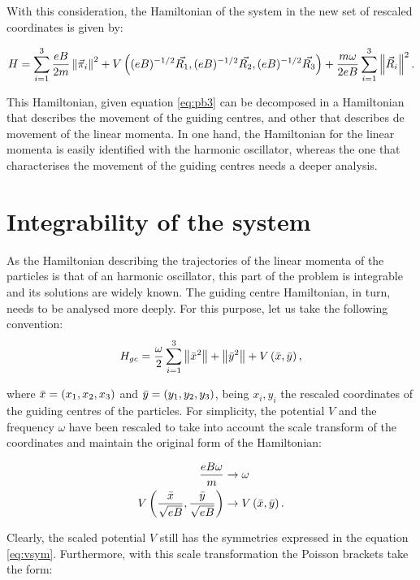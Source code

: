 With this consideration, the Hamiltonian of the system in the new set of rescaled coordinates is given by:

\begin{equation}
H = \sum_{i=1}^{3} \frac{eB}{2m} \left\lVert  \vec{\pi}_i \right\rVert^2
+ V\left(  (eB)^{-1/2}\vec{R_1},(eB)^{-1/2}\vec{R_2}, (eB)^{-1/2}\vec{R_3}  \right)
+\frac{m\omega}{2eB}\sum_{i=1}^{3} \left\lVert \vec{R}_i \right\rVert^2.
\label{eq:newham}
\end{equation}

This Hamiltonian, given equation \eqref{eq:pb3} can be decomposed in a Hamiltonian that describes the movement of the guiding centres, and other that describes de movement of the linear momenta. In one hand, the Hamiltonian for the linear momenta is easily identified with the harmonic oscillator, whereas the one that characterises the movement of the guiding centres needs a deeper analysis.

\section{Integrability of the system}
As the Hamiltonian describing the trajectories of the linear momenta of the particles is that of an harmonic oscillator, this part of the problem is integrable and its solutions are widely known. The guiding centre Hamiltonian, in turn, needs to be analysed more deeply. For this purpose, let us take the following convention:\\

\begin{equation}
H_{gc} = \frac{\omega}{2} \sum_{i=1}^{3} \left\lVert \bar{x}^2 \right\rVert + \left\lVert \bar{y}^2 \right\rVert
+ V\left( \bar{x},\bar{y} \right),
\label{eq:hamgc}
\end{equation}

where $\bar{x} = \left( x_1,x_2,x_3 \right)$ and $\bar{y} = \left( y_1,y_2,y_3 \right)$, being $x_i,y_i$ the rescaled coordinates of the guiding centres of the particles. For simplicity, the potential $V$ and the frequency $\omega$ have been rescaled to take into account the scale transform of the coordinates and maintain the original form of the Hamiltonian:

\begin{align*}
\frac{eB\omega}{m} &\rightarrow \omega\\
 V\left( \frac{\bar{x}}{\sqrt{eB}},\frac{\bar{y}}{\sqrt{eB}} \right) &\rightarrow V\left( \bar{x},\bar{y} \right).
\end{align*}

Clearly, the scaled potential $V$ still has the symmetries expressed in the equation \eqref{eq:vsym}. Furthermore, with this scale transformation the Poisson brackets take the form:

